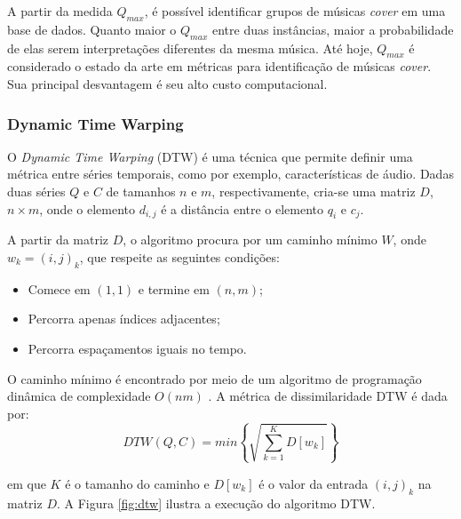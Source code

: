 A partir da medida \({Q_{max}}\), é possível identificar grupos de músicas \textit{cover} em uma base de dados. Quanto maior o \({Q_{max}}\) entre duas instâncias, maior a probabilidade de elas serem interpretações diferentes da mesma música. Até hoje, \({Q_{max}}\) é considerado o estado da arte em métricas para identificação de músicas \textit{cover}. Sua principal desvantagem é seu alto custo computacional.

\subsubsection{Dynamic Time Warping} \label{subsubsec:dtw}
O \textit{Dynamic Time Warping} (DTW) \cite{keogh2004} é uma técnica que permite definir uma métrica entre séries temporais, como por exemplo, características de áudio. Dadas duas séries \({Q}\) e \({C}\) de tamanhos \({n}\) e \({m}\), respectivamente, cria-se uma matriz \({D}\), \({n\times m}\), onde o elemento \({d_{i,j}}\) é a distância entre o elemento \({q_{i}}\) e \({c_{j}}\).

A partir da matriz \({D}\), o algoritmo procura por um caminho mínimo \({W}\), onde \({w_{k} = (i,j)_{k}}\), que respeite as seguintes condições:

\begin{itemize}
    \item Comece em \({(1,1)}\) e termine em \({(n,m)}\);
    \item Percorra apenas índices adjacentes;
    \item Percorra espaçamentos iguais no tempo.
\end{itemize}

O caminho mínimo é encontrado por meio de um algoritmo de programação dinâmica de complexidade \({O(nm)}\) \cite{keogh2004}. A métrica de dissimilaridade DTW é dada por:
\begin{equation}
    DTW(Q,C) = min\left\{\sqrt{\sum_{k=1}^{K} D[w_{k}]}\right\}
\end{equation}

em que \({K}\) é o tamanho do caminho e \({D[w_{k}]}\) é o valor da entrada \({(i,j)_{k}}\) na matriz \({D}\). A Figura \ref{fig:dtw} ilustra a execução do algoritmo DTW.

